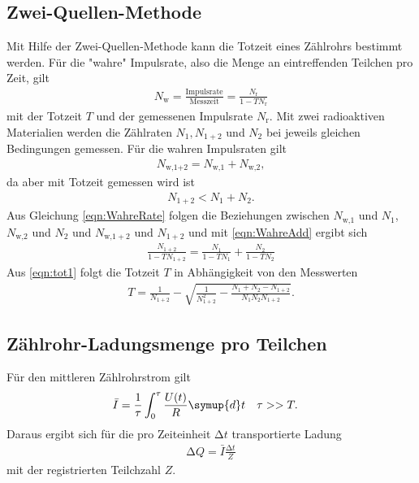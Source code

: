 \subsection{Zwei-Quellen-Methode}

Mit Hilfe der Zwei-Quellen-Methode kann die Totzeit eines Zählrohrs bestimmt
werden.
Für die "wahre" Impulsrate, also die Menge an eintreffenden Teilchen pro
Zeit, gilt
\begin{align}
  N_\text{w} = \frac{\text{Impulsrate}}{\text{Messzeit}} =
  \frac{N_\text{r}}{1-TN_\text{r}}
  \label{eqn:WahreRate}
\end{align}
mit der Totzeit $T$ und der gemessenen Impulsrate $N_\text{r}$.
Mit zwei radioaktiven Materialien werden die Zählraten
$N_1, N_{1+2}$ und $N_2$ bei jeweils gleichen Bedingungen gemessen.
Für die wahren Impulsraten gilt
\begin{align}
  N_\text{{w,}1+2} = N_\text{w,1} + N_\text{w,2},
  \label{eqn:WahreAdd}
\end{align}
da aber mit Totzeit gemessen wird ist
\begin{align}
  N_{1+2} < N_1 + N_2.
\end{align}
Aus Gleichung \eqref{eqn:WahreRate} folgen die Beziehungen zwischen
$N_\text{w,1}$ und $N_1$, $N_\text{w,2}$ und $N_2$ und
$N_{\text{w,}1+2}$ und $N_{1+2}$
und mit \eqref{eqn:WahreAdd} ergibt sich
\begin{align}
  \frac{N_{1+2}}{1-TN_{1+2}} = \frac{N_1}{1-TN_1} + \frac{N_2}{1-TN_2}
  \label{eqn:tot1}
\end{align}
Aus \eqref{eqn:tot1} folgt die Totzeit $T$ in Abhängigkeit von den Messwerten
\begin{align}
  T = \frac{1}{N_{1+2}} - \sqrt{\frac{1}{N_{1+2}^2}-\frac{N_1 + N_2 - N_{1+2}}{N_1 N_2 N_{1+2}}}.
  \label{eqn:totzeit2quellen}
\end{align}

\subsection{Zählrohr-Ladungsmenge pro Teilchen}

Für den mittleren Zählrohrstrom gilt
\begin{align}
  & \bar{I} = \frac{1}{\tau} \int_{0}^{\tau} \frac{U(t)}{R} \symup{d}t & & \tau >> T.
\end{align}
Daraus ergibt sich für die pro Zeiteinheit $\increment t$ transportierte Ladung
\begin{align}
  \increment Q = \bar{I} \frac{\increment t}{Z}
  \label{eqn:ladungproteilchen}
\end{align}
mit der registrierten Teilchzahl $Z$.
